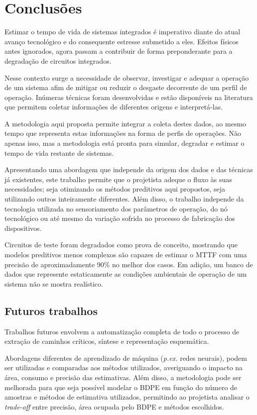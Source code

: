 \chapter{Conclusões}
Estimar o tempo de vida de sistemas integrados é imperativo diante do atual avanço tecnológico e do consequente estresse submetido a eles. Efeitos físicos antes ignorados, agora passam a contribuir de forma preponderante para a degradação de circuitos integrados.

Nesse contexto surge a necessidade de observar, investigar e adequar a operação de um sistema afim de mitigar ou reduzir o desgaste decorrente de um perfil de operação. Inúmeras técnicas foram desenvolvidas e estão disponíveis na literatura que permitem coletar informações de diferentes origens e interpretá-las.

A metodologia aqui proposta permite integrar a coleta destes dados, ao mesmo tempo que representa estas informações na forma de perfis de operações. Não apenas isso, mas a metodologia está pronta para simular, degradar e estimar o tempo de vida restante de sistemas.

Apresentando uma abordagem que independe da origem dos dados e das técnicas já existentes, este trabalho permite que o projetista adeque o fluxo às suas necessidades; seja otimizando os métodos preditivos aqui propostos, seja utilizando outros inteiramente diferentes. Além disso, o trabalho independe da tecnologia utilizada no sensoriamento dos parâmetros de operação, do nó tecnológico ou até mesmo da variação sofrida no processo de fabricação dos dispositivos.

Circuitos de teste foram degradados como prova de conceito, mostrando que modelos preditivos menos complexos são capazes de estimar o MTTF com uma precisão de aproximadamente 90\% no melhor dos casos. Em adição, um banco de dados que represente estaticamente as condições ambientais de operação de um sistema não se mostra realístico.

\section{Futuros trabalhos}
Trabalhos futuros envolvem a automatização completa de todo o processo de extração de caminhos críticos, síntese e representação esquemática.

Abordagens diferentes de aprendizado de máquina (\textit{p.ex.} redes neurais), podem ser utilizadas e comparadas aos métodos utilizados, averiguando o impacto na área, consumo e precisão das estimativas. Além disso, a metodologia pode ser melhorada para que seja possível modelar o BDPE em função do número de amostras e métodos de estimativa utilizados, permitindo ao projetista analisar o \textit{trade-off} entre precisão, área ocupada pelo BDPE e métodos escolhidos.
